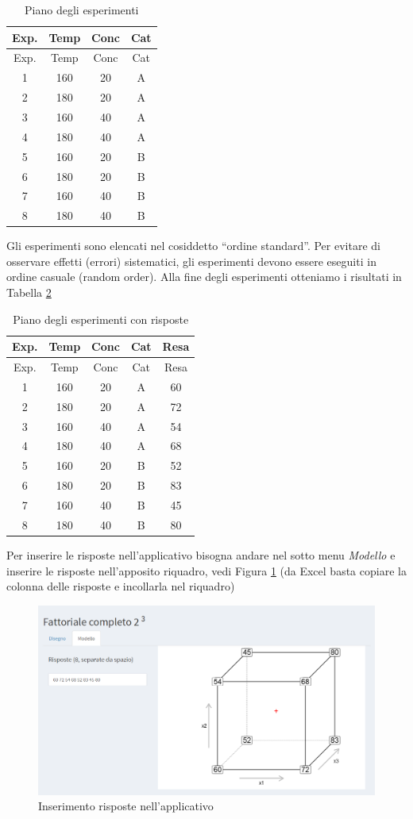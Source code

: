 \documentclass[
  11pt,
]{book}
\begin{document}
\begin{longtable}[]{@{}cccc@{}}
\caption{\label{tab:esperimenti}Piano degli esperimenti}\tabularnewline
\toprule
Exp. & Temp & Conc & Cat\tabularnewline
\midrule
\endfirsthead
\toprule
Exp. & Temp & Conc & Cat\tabularnewline
\midrule
\endhead
1 & 160 & 20 & A\tabularnewline
2 & 180 & 20 & A\tabularnewline
3 & 160 & 40 & A\tabularnewline
4 & 180 & 40 & A\tabularnewline
5 & 160 & 20 & B\tabularnewline
6 & 180 & 20 & B\tabularnewline
7 & 160 & 40 & B\tabularnewline
8 & 180 & 40 & B\tabularnewline
\bottomrule
\end{longtable}

Gli esperimenti sono elencati nel cosiddetto ``ordine standard''. Per
evitare di osservare effetti (errori) sistematici, gli esperimenti
devono essere eseguiti in ordine casuale (random order). Alla fine degli
esperimenti otteniamo i risultati in Tabella \ref{tab:esperimentir}

\begin{longtable}[]{@{}ccccc@{}}
\caption{\label{tab:esperimentir}Piano degli esperimenti con risposte}\tabularnewline
\toprule
Exp. & Temp & Conc & Cat & Resa\tabularnewline
\midrule
\endfirsthead
\toprule
Exp. & Temp & Conc & Cat & Resa\tabularnewline
\midrule
\endhead
1 & 160 & 20 & A & 60\tabularnewline
2 & 180 & 20 & A & 72\tabularnewline
3 & 160 & 40 & A & 54\tabularnewline
4 & 180 & 40 & A & 68\tabularnewline
5 & 160 & 20 & B & 52\tabularnewline
6 & 180 & 20 & B & 83\tabularnewline
7 & 160 & 40 & B & 45\tabularnewline
8 & 180 & 40 & B & 80\tabularnewline
\bottomrule
\end{longtable}

Per inserire le risposte nell'applicativo bisogna andare nel sotto menu
\emph{Modello} e inserire le risposte nell'apposito riquadro, vedi Figura
\ref{fig:fc5} (da Excel basta copiare la colonna delle risposte e
incollarla nel riquadro)

\begin{figure}

{\centering \includegraphics[width=1\linewidth]{Immagini/Fatt_compl/05_risp} 

}

\caption{Inserimento risposte nell'applicativo}\label{fig:fc5}
\end{figure}
\end{document}
